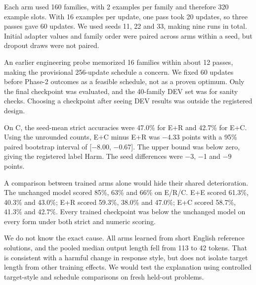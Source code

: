\medskip{}\par\nopagebreak

Each arm used 160 families, with 2 examples per family and therefore 320 example slots. With 16 examples per update, one pass took 20 updates, so three passes gave 60 updates. We used seeds 11, 22 and 33, making nine runs in total. Initial adapter values and family order were paired across arms within a seed, but dropout draws were not paired.

\medskip{}\par\nopagebreak

An earlier engineering probe memorized 16 families within about 12 passes, making the provisional 256-update schedule a concern. We fixed 60 updates before Phase-2 outcomes as a feasible schedule, not as a proven optimum. Only the final checkpoint was evaluated, and the 40-family DEV set was for sanity checks. Choosing a checkpoint after seeing DEV results was outside the registered design.

\medskip{}\par\nopagebreak

On C, the seed-mean strict accuracies were 47.0\% for E+R and 42.7\% for E+C. Using the unrounded counts, E+C minus E+R was −4.33 points with a 95\% paired bootstrap interval of [−8.00, −0.67]. The upper bound was below zero, giving the registered label Harm. The seed differences were −3, −1 and −9 points.

\medskip{}\par\nopagebreak

A comparison between trained arms alone would hide their shared deterioration. The unchanged model scored 85\%, 63\% and 66\% on E/R/C. E+E scored 61.3\%, 40.3\% and 43.0\%; E+R scored 59.3\%, 38.0\% and 47.0\%; E+C scored 58.7\%, 41.3\% and 42.7\%. Every trained checkpoint was below the unchanged model on every form under both strict and numeric scoring.

\medskip{}\par\nopagebreak

We do not know the exact cause. All arms learned from short English reference solutions, and the pooled median output length fell from 113 to 42 tokens. That is consistent with a harmful change in response style, but does not isolate target length from other training effects. We would test the explanation using controlled target-style and schedule comparisons on fresh held-out problems.

